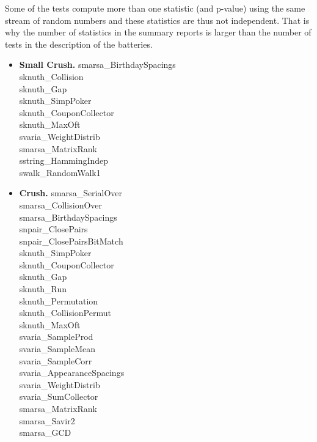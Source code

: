 Some of the tests compute more than one statistic (and p-value) using the same stream of random
numbers and these statistics are thus not independent. That is why the number of statistics
in the summary reports is larger than the number of tests in the description of the batteries.


\begin{itemize}
\item{\textbf{Small Crush.}}  smarsa\_BirthdaySpacings   \\ 
 sknuth\_Collision   \\ 
 sknuth\_Gap    \\ 
 sknuth\_SimpPoker   \\ 
 sknuth\_CouponCollector    \\ 
 sknuth\_MaxOft   \\ 
 svaria\_WeightDistrib     \\ 
 smarsa\_MatrixRank     \\  
 sstring\_HammingIndep    \\ 
 swalk\_RandomWalk1      \\ 
\item{\textbf{Crush.}}  smarsa\_SerialOver   \\    
 smarsa\_CollisionOver      \\ 
 smarsa\_BirthdaySpacings      \\ 
 snpair\_ClosePairs      \\ 
 snpair\_ClosePairsBitMatch     \\  
 sknuth\_SimpPoker      \\ 
 sknuth\_CouponCollector      \\ 
 sknuth\_Gap      \\ 
 sknuth\_Run      \\ 
 sknuth\_Permutation      \\ 
 sknuth\_CollisionPermut      \\ 
 sknuth\_MaxOft      \\ 
 svaria\_SampleProd      \\ 
 svaria\_SampleMean     \\ 
 svaria\_SampleCorr      \\ 
 svaria\_AppearanceSpacings   \\    
 svaria\_WeightDistrib     \\  
 svaria\_SumCollector      \\ 
 smarsa\_MatrixRank      \\ 
 smarsa\_Savir2      \\ 
 smarsa\_GCD      \\ 

\end{itemize}
